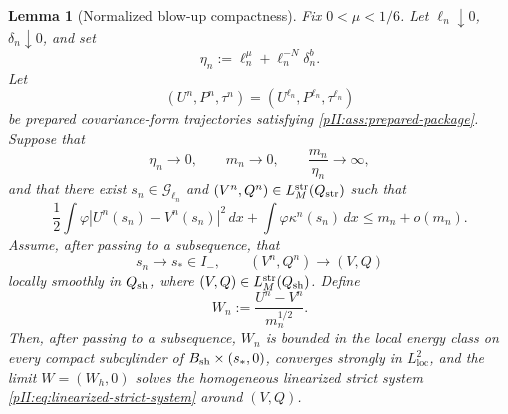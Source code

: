 \documentclass[11pt]{article}
\numberwithin{equation}{section}
\theoremstyle{plain}
\newtheorem{lemma}{Lemma}[section]
\theoremstyle{definition}
\theoremstyle{remark}
\newcommand{\loc}{\mathrm{loc}}
\newcommand{\str}{\mathrm{str}}
\newcommand{\dx}{\,dx}
\begin{document}
\begin{lemma}[Normalized blow-up compactness]\label{pII:lem:normalized-blowup-compactness}
Fix $0<\mu<1/6$.  Let $\ell_n\downarrow0$, $\delta_n\downarrow0$, and set
\[
        \eta_n:=\ell_n^\mu+\ell_n^{-N}\delta_n^b.
\]
Let
\[
        (U^n,P^n,\tau^n)=(U^{\ell_n},P^{\ell_n},\tau^{\ell_n})
\]
be prepared covariance-form trajectories satisfying \cref{pII:ass:prepared-package}.  Suppose that
\[
        \eta_n\to0,
        \qquad m_n\to0,
        \qquad \frac{m_n}{\eta_n}\to\infty,
\]
and that there exist $s_n\in\mathcal G_{\ell_n}$ and $(V^n,Q^n)\in L_M^{\str}(Q_{\rm str})$ such that
\begin{equation}\label{pII:eq:blowup-almost-minimality}
        \frac12\int\varphi|U^n(s_n)-V^n(s_n)|^2\dx
        +\int\varphi\kappa^n(s_n)\dx
        \le m_n+o(m_n).
\end{equation}
Assume, after passing to a subsequence, that
\[
        s_n\to s_*\in I_- ,
        \qquad
        (V^n,Q^n)\to(V,Q)
\]
locally smoothly in $Q_{\rm sh}$, where $(V,Q)\in L_M^{\str}(Q_{\rm sh})$.  Define
\[
        W_n:=\frac{U^n-V^n}{m_n^{1/2}}.
\]
Then, after passing to a subsequence, $W_n$ is bounded in the local energy class on every compact subcylinder of $B_{\rm sh}\times(s_*,0)$, converges strongly in $L^2_{\loc}$, and the limit $W=(W_h,0)$ solves the homogeneous linearized strict system \eqref{pII:eq:linearized-strict-system} around $(V,Q)$.
\end{lemma}
\end{document}
